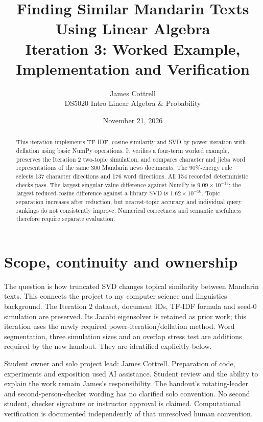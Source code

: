 \documentclass[11pt]{article}
\title{Finding Similar Mandarin Texts\\Using Linear Algebra\\[6pt]
\large Iteration 3: Worked Example, Implementation and Verification}
\author{James Cottrell\\DS5020 Intro Linear Algebra \& Probability}
\date{November 21, 2026}
\newcommand{\VerificationCount}{154}
\newcommand{\MaxSigmaError}{$9.09\times10^{-13}$}
\newcommand{\MaxCosineError}{$1.62\times10^{-10}$}
\newcommand{\CharRank}{137}
\newcommand{\WordRank}{176}
\begin{document}
\maketitle
\begin{abstract}
This iteration implements TF-IDF, cosine similarity and SVD by power iteration
with deflation using basic NumPy operations. It verifies a four-term worked
example, preserves the Iteration 2 two-topic simulation, and compares character
and jieba word representations of the same 300 Mandarin news documents.
The 90\%-energy rule selects \CharRank{} character directions and \WordRank{}
word directions. All \VerificationCount{} recorded deterministic checks pass.
The largest singular-value difference against NumPy is \MaxSigmaError{};
the largest reduced-cosine difference against a library SVD is \MaxCosineError.
Topic separation increases after reduction, but nearest-topic accuracy and
individual query rankings do not consistently improve. Numerical correctness
and semantic usefulness therefore require separate evaluation.
\end{abstract}

\section{Scope, continuity and ownership}
The question is how truncated SVD changes topical similarity between Mandarin
texts. This connects the project to my computer science and linguistics background.
The Iteration 2 dataset, document IDs, TF-IDF formula and seed-0 simulation are
preserved. Its Jacobi eigensolver is retained as prior work; this iteration uses
the newly required power-iteration/deflation method. Word segmentation, three
simulation sizes and an overlap stress test are additions required by the new
handout. They are identified explicitly below.

Student owner and solo project lead: James Cottrell. Preparation of code,
experiments and exposition used AI assistance. Student review and the ability
to explain the work remain James's responsibility. The handout's rotating-leader
and second-person-checker wording has no clarified solo convention. No second
student, checker signature or instructor approval is claimed. Computational
verification is documented independently of that unresolved human convention.
\end{document}
